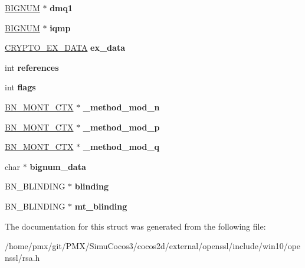 \begin{DoxyCompactItemize}
\mbox{\label{structrsa__st_afc6066b59b320df8632e9bdc3cce2972}} 
\hyperlink{structbignum__st}{B\+I\+G\+N\+UM} $\ast$ {\bfseries dmq1}
\item 
\mbox{\label{structrsa__st_af686fae5b080774028bc3f41370f57e6}} 
\hyperlink{structbignum__st}{B\+I\+G\+N\+UM} $\ast$ {\bfseries iqmp}
\item 
\mbox{\label{structrsa__st_a721c63c63c45f67f572aaa177e2357ad}} 
\hyperlink{structcrypto__ex__data__st}{C\+R\+Y\+P\+T\+O\+\_\+\+E\+X\+\_\+\+D\+A\+TA} {\bfseries ex\+\_\+data}
\item 
\mbox{\label{structrsa__st_a3b8d372e797fd47606f57789f1c98df9}} 
int {\bfseries references}
\item 
\mbox{\label{structrsa__st_abf88fc039269dcd478fd4436d4b332ae}} 
int {\bfseries flags}
\item 
\mbox{\label{structrsa__st_a3942c90b1f0b16266528f88d14adc6ca}} 
\hyperlink{structbn__mont__ctx__st}{B\+N\+\_\+\+M\+O\+N\+T\+\_\+\+C\+TX} $\ast$ {\bfseries \+\_\+method\+\_\+mod\+\_\+n}
\item 
\mbox{\label{structrsa__st_a468edd0a44ae2aefed076f99f8714ffd}} 
\hyperlink{structbn__mont__ctx__st}{B\+N\+\_\+\+M\+O\+N\+T\+\_\+\+C\+TX} $\ast$ {\bfseries \+\_\+method\+\_\+mod\+\_\+p}
\item 
\mbox{\label{structrsa__st_a463b97b59664b66f0e29881c915a1489}} 
\hyperlink{structbn__mont__ctx__st}{B\+N\+\_\+\+M\+O\+N\+T\+\_\+\+C\+TX} $\ast$ {\bfseries \+\_\+method\+\_\+mod\+\_\+q}
\item 
\mbox{\label{structrsa__st_afa45d273e5fccb2c8f806425aa7f8a4a}} 
char $\ast$ {\bfseries bignum\+\_\+data}
\item 
\mbox{\label{structrsa__st_a953fd4cc8742674450f7a17841c5bcd5}} 
B\+N\+\_\+\+B\+L\+I\+N\+D\+I\+NG $\ast$ {\bfseries blinding}
\item 
\mbox{\label{structrsa__st_a7e167b57f2c8af705b7519cc22458cba}} 
B\+N\+\_\+\+B\+L\+I\+N\+D\+I\+NG $\ast$ {\bfseries mt\+\_\+blinding}
\end{DoxyCompactItemize}


The documentation for this struct was generated from the following file\+:\begin{DoxyCompactItemize}
\item 
/home/pmx/git/\+P\+M\+X/\+Simu\+Cocos3/cocos2d/external/openssl/include/win10/openssl/rsa.\+h\end{DoxyCompactItemize}
